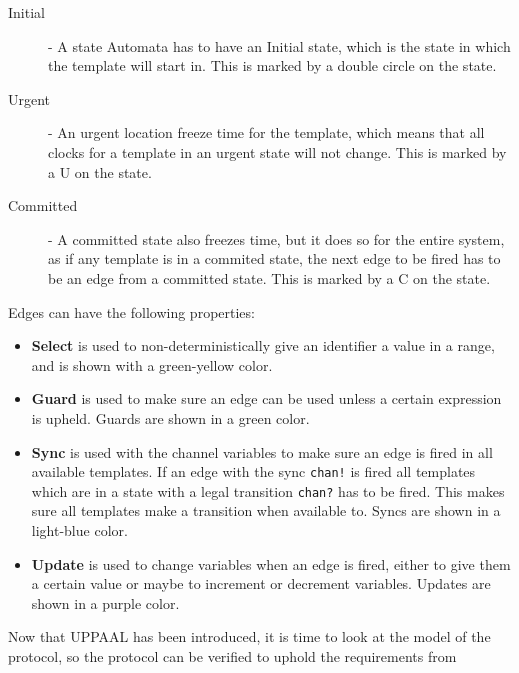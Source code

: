 \begin{description}
	\item [Initial] - A state Automata has to have an Initial state, which is the state in which the template will start in. This is marked by a double circle on the state.
	\item [Urgent] - An urgent location freeze time for the template, which means that all clocks for a template in an urgent state will not change. This is marked by a U on the state.
	\item [Committed] - A committed state also freezes time, but it does so for the entire system, as if any template is in a commited state, the next edge to be fired has to be an edge from a committed state. This is marked by a C on the state.
\end{description}

Edges can have the following properties:

\begin{itemize}
	\item \textbf{Select} is used to non-deterministically give an identifier a value in a range, and is shown with a green-yellow color.
	\item \textbf{Guard} is used to make sure an edge can be used unless a certain expression is upheld. Guards are shown in a green color.
	\item \textbf{Sync} is used with the channel variables to make sure an edge is fired in all available templates. If an edge with the sync \texttt{chan!} is fired all templates which are in a state with a legal transition \texttt{chan?} has to be fired. This makes sure all templates make a transition when available to. Syncs are shown in a light-blue color.
	\item \textbf{Update} is used to change variables when an edge is fired, either to give them a certain value or maybe to increment or decrement variables. Updates are shown in a purple color.
\end{itemize}

Now that UPPAAL has been introduced, it is time to look at the model of the protocol, so the protocol can be verified to uphold the requirements from 

